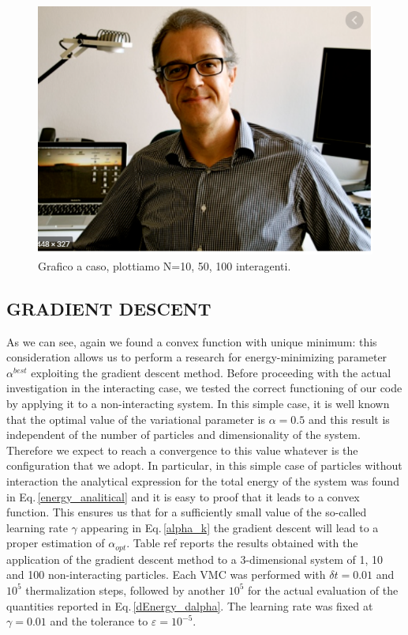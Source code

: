 \begin{figure}[H]
    \includegraphics[scale=0.5]{images/yaaaa.png}
    \caption{Grafico a caso, plottiamo N=10, 50, 100 interagenti.}
    \label{fig:E_over_N}
\end{figure}


\subsection{GRADIENT DESCENT}

As we can see, again we found a convex function with unique minimum: this consideration allows us to perform a research for energy-minimizing parameter $\alpha^{best}$ exploiting the gradient descent method. Before proceeding with the actual investigation in the interacting case, we tested the correct functioning of our code by applying it to a non-interacting system. In this simple case, it is well known that the optimal value of the variational parameter is $\alpha=0.5$ and this result is independent of the number of particles and dimensionality of the system. Therefore we expect to reach a convergence to this value whatever is the configuration that we adopt. In particular, in this simple case of particles without interaction the analytical expression for the total energy of the system was found in Eq.\,\ref{energy_analitical} and it is easy to proof that it leads to a convex function. This ensures us that for a sufficiently small value of the so-called learning rate $\gamma$ appearing in Eq.\,\ref{alpha_k} the gradient descent will lead to a proper estimation of $\alpha_{opt}$. Table ref reports the results obtained with the application of the gradient descent method to a 3-dimensional system of 1, 10 and 100 non-interacting particles. Each VMC was performed with $\delta t=0.01$ and $10^5$ thermalization steps, followed by another $10^5$ for the actual evaluation of the quantities reported in Eq.\,\ref{dEnergy_dalpha}. The learning rate was fixed at $\gamma=0.01$ and the tolerance to $\varepsilon=10^{-5}$.



